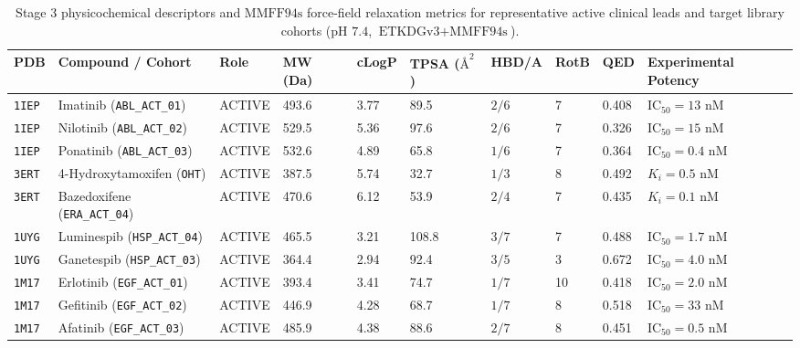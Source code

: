 \documentclass[11pt,a4paper]{article}
\begin{document}
\begin{table}[!htbp]
\centering
\caption{Stage 3 physicochemical descriptors and $\text{MMFF94s}$ force-field relaxation metrics for representative active clinical leads and target library cohorts ($\text{pH }7.4$, $\text{ETKDGv3} + \text{MMFF94s}$).}
\label{tab:stage3}
\vspace{2pt}
{\footnotesize
\renewcommand{\arraystretch}{1.20}
\begin{tabularx}{\textwidth}{L{0.85cm} L{2.8cm} C{1.15cm} R{1.1cm} R{0.9cm} R{1.15cm} C{1.25cm} C{0.8cm} R{0.85cm} Y}
\toprule
{}
\textbf{PDB} & \textbf{Compound / Cohort} & \textbf{Role} & \textbf{MW (Da)} & \textbf{cLogP} & \textbf{TPSA ($\text{\AA}^2$)} & \textbf{HBD/A} & \textbf{RotB} & \textbf{QED} & \textbf{Experimental Potency} \\
\midrule
\texttt{1IEP} & Imatinib (\texttt{ABL\_ACT\_01}) & ACTIVE & 493.6 & 3.77 & 89.5 & $2 / 6$ & 7 & 0.408 & $\text{IC}_{50} = 13\text{ nM}$ \\
\texttt{1IEP} & Nilotinib (\texttt{ABL\_ACT\_02}) & ACTIVE & 529.5 & 5.36 & 97.6 & $2 / 6$ & 7 & 0.326 & $\text{IC}_{50} = 15\text{ nM}$ \\
\texttt{1IEP} & Ponatinib (\texttt{ABL\_ACT\_03}) & ACTIVE & 532.6 & 4.89 & 65.8 & $1 / 6$ & 7 & 0.364 & $\text{IC}_{50} = 0.4\text{ nM}$ \\
\texttt{3ERT} & 4-Hydroxytamoxifen (\texttt{OHT}) & ACTIVE & 387.5 & 5.74 & 32.7 & $1 / 3$ & 8 & 0.492 & $K_i = 0.5\text{ nM}$ \\
\texttt{3ERT} & Bazedoxifene (\texttt{ERA\_ACT\_04}) & ACTIVE & 470.6 & 6.12 & 53.9 & $2 / 4$ & 7 & 0.435 & $K_i = 0.1\text{ nM}$ \\
\texttt{1UYG} & Luminespib (\texttt{HSP\_ACT\_04}) & ACTIVE & 465.5 & 3.21 & 108.8 & $3 / 7$ & 7 & 0.488 & $\text{IC}_{50} = 1.7\text{ nM}$ \\
\texttt{1UYG} & Ganetespib (\texttt{HSP\_ACT\_03}) & ACTIVE & 364.4 & 2.94 & 92.4 & $3 / 5$ & 3 & 0.672 & $\text{IC}_{50} = 4.0\text{ nM}$ \\
\texttt{1M17} & Erlotinib (\texttt{EGF\_ACT\_01}) & ACTIVE & 393.4 & 3.41 & 74.7 & $1 / 7$ & 10 & 0.418 & $\text{IC}_{50} = 2.0\text{ nM}$ \\
\texttt{1M17} & Gefitinib (\texttt{EGF\_ACT\_02}) & ACTIVE & 446.9 & 4.28 & 68.7 & $1 / 7$ & 8 & 0.518 & $\text{IC}_{50} = 33\text{ nM}$ \\
\texttt{1M17} & Afatinib (\texttt{EGF\_ACT\_03}) & ACTIVE & 485.9 & 4.38 & 88.6 & $2 / 7$ & 8 & 0.451 & $\text{IC}_{50} = 0.5\text{ nM}$ \\

\end{tabularx}}
\end{table}
\end{document}

